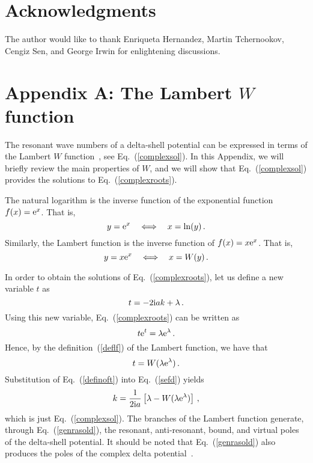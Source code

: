 \documentclass[12pt]{article}
\newcommand{\rmi}{{\rm i}}
\newcommand{\rme}{{\rm e}}
\begin{document}
\section*{Acknowledgments}
The author would like to thank Enriqueta Hernandez, Martin 
Tchernookov, Cengiz Sen, and George Irwin for enlightening discussions.


  

\appendix
\section{Appendix A: The Lambert $W$ function}
\setcounter{equation}{0}
\label{app:tlf}

The resonant wave numbers of a delta-shell potential can be expressed 
in terms of the Lambert $W$ 
function~\cite{LAMBERT1,LAMBERT2,LAMBERT3,LAMBERT4,LAMBERT5,LAMBERT6},
see Eq.~(\ref{complexsol}). In this Appendix, we will briefly
review the main properties of $W$, and we will show that 
Eq.~(\ref{complexsol}) provides the solutions to 
Eq.~(\ref{complexroots}).

The natural logarithm is the inverse function of the exponential function
$f(x)=\rme ^x$. That is,
\begin{equation}
       y=\rme ^x \quad \Longleftrightarrow \quad x=\ln (y) \, . 
       \label{defanlo}
\end{equation}
Similarly, the Lambert function is the inverse function of 
$f(x)=x\rme ^x$. That is,
\begin{equation}
       y=x\rme ^x \quad \Longleftrightarrow \quad x=W(y) \, . 
       \label{deflf}
\end{equation}

In order to obtain the solutions of Eq.~(\ref{complexroots}), let us 
define a new variable $t$ as~\cite{LAMBERT4}
\begin{equation}
     t=-2\rmi a k + \lambda \, .
    \label{definoft}
\end{equation}
Using this new variable, Eq.~(\ref{complexroots}) can be written as
\begin{equation}
    t\rme ^t = \lambda  \rme ^{\lambda } \, .
\end{equation} 
Hence, by the definition~(\ref{deflf}) of the Lambert function, we have
that
\begin{equation}
      t=W(\lambda  \rme ^{\lambda}) \, .
       \label{sefd}
\end{equation}
Substitution of Eq.~(\ref{definoft}) into Eq.~(\ref{sefd}) yields
\begin{equation}
        k=\frac{1}{2 \rmi a} \left[ \lambda  -  
         W(\lambda  \rme ^{\lambda })\right] \, ,
        \label{genrasold}
\end{equation}
which is just Eq.~(\ref{complexsol}). The branches of the Lambert function 
generate, through Eq.~(\ref{genrasold}), the resonant, anti-resonant, 
bound, and virtual poles of the delta-shell potential. It should be noted that
Eq.~(\ref{genrasold}) also produces the poles of the complex delta 
potential~\cite{GASTONPRA14}.
\end{document}
